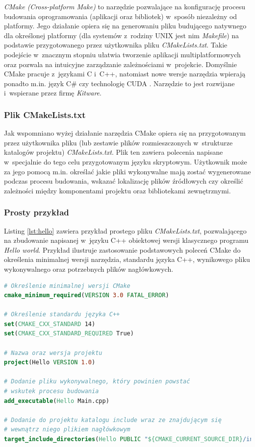 \textit{CMake (Cross-platform Make)} to narzędzie pozwalające na konfigurację procesu budowania oprogramowania (aplikacji oraz bibliotek) w~sposób niezależny od platformy. Jego działanie opiera się na generowaniu pliku budującego natywnego dla określonej platformy \cite{CMakeIntro} (dla systemów z~rodziny UNIX jest nim \textit{Makefile}) na podstawie przygotowanego przez użytkownika pliku \textit{CMakeLists.txt}. Takie podejście w~znacznym stopniu ułatwia tworzenie aplikacji multiplatformowych oraz pozwala na intuicyjne zarządzanie zależnościami w~projekcie. Domyślnie CMake pracuje z~językami C i~C++, natomiast nowe wersje narzędzia wpierają ponadto m.in. język C\# czy technologię CUDA \cite{CMakeSupport}. Narzędzie to jest rozwijane i~wspierane przez firmę \textit{Kitware}.\par

\subsubsection*{Plik CMakeLists.txt}
Jak wspomniano wyżej działanie narzędzia CMake opiera się na przygotowanym przez użytkownika pliku (lub zestawie plików rozmieszczonych w~strukturze katalogów projektu) \textit{CMakeLists.txt}. Plik ten zawiera polecenia napisane w~specjalnie do tego celu przygotowanym języku skryptowym. Użytkownik może za jego pomocą  m.in. określać jakie pliki wykonywalne mają zostać wygenerowane podczas procesu budowania, wskazać lokalizację plików źródłowych czy określić zależności między komponentami projektu oraz bibliotekami zewnętrznymi. \par

\subsubsection*{Prosty przykład}
Listing \ref{lst:hello} zawiera przykład prostego pliku \textit{CMakeLists.txt}, pozwalającego na zbudowanie napisanej w~języku C++ obiektowej wersji klasycznego programu \textit{Hello world}. Przykład ilustruje zastosowanie podstawowych poleceń CMake do określenia minimalnej wersji narzędzia, standardu języka C++, wynikowego pliku wykonywalnego oraz potrzebnych plików nagłówkowych. \par

\begin{lstlisting}[language=cmake,caption={Przykład prostego pliku CMakeLists.txt przeznaczonego do budowania programu napisanego w~C++}, label={lst:hello}]
# Określenie minimalnej wersji CMake
cmake_minimum_required(VERSION 3.0 FATAL_ERROR)

# Określenie standardu języka C++
set(CMAKE_CXX_STANDARD 14)
set(CMAKE_CXX_STANDARD_REQUIRED True)

# Nazwa oraz wersja projektu
project(Hello VERSION 1.0)

# Dodanie pliku wykonywalnego, który powinien powstać
# wskutek procesu budowania
add_executable(Hello Main.cpp)

# Dodanie do projektu katalogu include wraz ze znajdującym się 
# wewnątrz niego plikiem nagłówkowym
target_include_directories(Hello PUBLIC "${CMAKE_CURRENT_SOURCE_DIR}/include")
\end{lstlisting}

